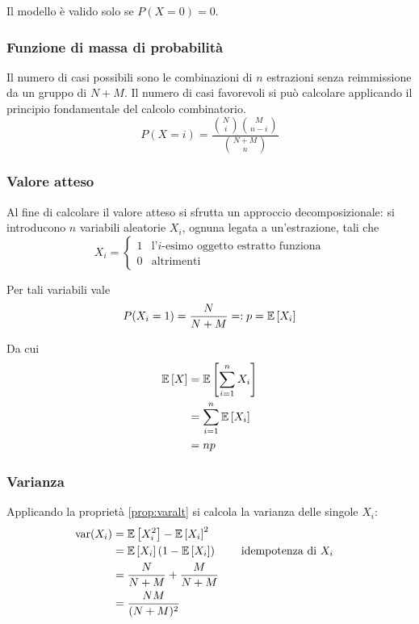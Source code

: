 Il modello è valido solo se $P(X=0)=0$.


\subsubsection{Funzione di massa di probabilità}
Il numero di casi possibili sono le combinazioni di $n$ estrazioni senza reimmissione da un gruppo di $N+M$. Il numero di casi favorevoli si può calcolare applicando il principio fondamentale del calcolo combinatorio.
\begin{equation*}
	P(X=i) = \frac{\binom{N}{i}\binom{M}{n-i}}{\binom{N+M}{n}}
\end{equation*}


\subsubsection{Valore atteso}
Al fine di calcolare il valore atteso si sfrutta un approccio decomposizionale: si introducono $n$ variabili aleatorie $X_i$, ognuna legata a un'estrazione, tali che
\begin{equation*}
	X_i = \begin{cases}
		1 & \text{l'$i$-esimo oggetto estratto funziona} \\
		0 & \text{altrimenti}
	\end{cases}
\end{equation*}

Per tali variabili vale
\begin{equation*}
	P(X_i=1) = \frac{N}{N+M} =: p = \mathbb{E}\left[ X_i \right]
\end{equation*}

Da cui
\begin{align*}
	\mathbb{E}\left[ X \right] & = \mathbb{E}\left[ \sum_{i=1}^n X_i \right] \\
	       & = \sum_{i=1}^n \mathbb{E}\left[ X_i \right] \\
	       & = np
\end{align*}


\subsubsection{Varianza}
Applicando la proprietà \ref{prop:varalt} si calcola la varianza delle singole $X_i$:
\begin{align*}
	\operatorname{var}(X_i) & = \mathbb{E}\left[ X_i^2 \right]-\mathbb{E}\left[ X_i \right]^2                                   \\
	          & = \mathbb{E}\left[ X_i \right](1-\mathbb{E}\left[ X_i \right])          & \quad & \text{idempotenza di $X_i$} \\
	          & = \frac{N}{N+M} + \frac{M}{N+M}                           \\
	          & = \frac{NM}{(N+M)^2}
\end{align*}

